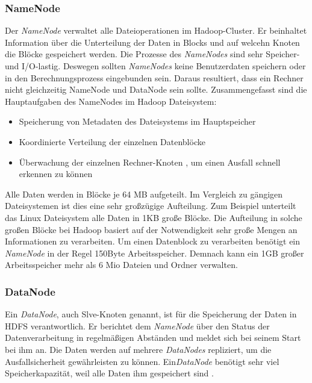 \subsubsection{NameNode}
Der \textit{NameNode} verwaltet alle Dateioperationen im Hadoop-Cluster. Er beinhaltet Information über die Unterteilung der Daten in Blocks und auf welcehn Knoten die Blöcke gespeichert werden.
Die Prozesse des  \textit{NameNodes} sind sehr Speicher- und I/O-lastig. Deswegen sollten \textit{NameNodes} keine Benutzerdaten speichern oder in den Berechnungsprozess eingebunden sein. Daraus resultiert, dass ein Rechner nicht gleichzeitig NameNode und DataNode sein sollte.
Zusammengefasst sind die Hauptaufgaben des NameNodes im Hadoop Dateisystem:
\begin{itemize}
\item Speicherung von Metadaten des Dateisystems im Hauptspeicher
\item Koordinierte Verteilung der einzelnen Datenblöcke
\item Überwachung der einzelnen Rechner-Knoten , um einen Ausfall schnell erkennen zu können \cite[S. XX]{Wartal2012}
\end{itemize}

Alle Daten werden in Blöcke je 64 MB aufgeteilt. Im Vergleich zu gängigen Dateisystemen ist dies eine sehr großzügige Aufteilung. Zum Beispiel unterteilt das Linux Dateisystem alle Daten in 1KB große Blöcke. Die Aufteilung in solche großen Blöcke bei Hadoop basiert auf der Notwendigkeit sehr große Mengen an Informationen zu verarbeiten. Um einen Datenblock zu verarbeiten benötigt ein \textit{NameNode} in der Regel 150Byte Arbeitsspeicher. Demnach kann ein 1GB großer Arbeitsspeicher mehr als 6 Mio Dateien und Ordner verwalten. \cite[S. XX]{Wartal2012}
\subsubsection{DataNode}
Ein \textit{DataNode}, auch Slve-Knoten genannt, ist für die Speicherung der Daten in \ac{HDFS} verantwortlich. Er berichtet dem \textit{NameNode} über den Status der Datenverarbeitung in regelmäßigen Abständen und meldet sich bei seinem Start bei ihm an. Die Daten werden auf mehrere \textit{DataNodes} repliziert, um die Ausfallsicherheit gewährleisten zu können.
Ein\textit{DataNode} benötigt sehr viel Speicherkapazität, weil alle Daten ihm gespeichert sind \cite{nameNode}.


